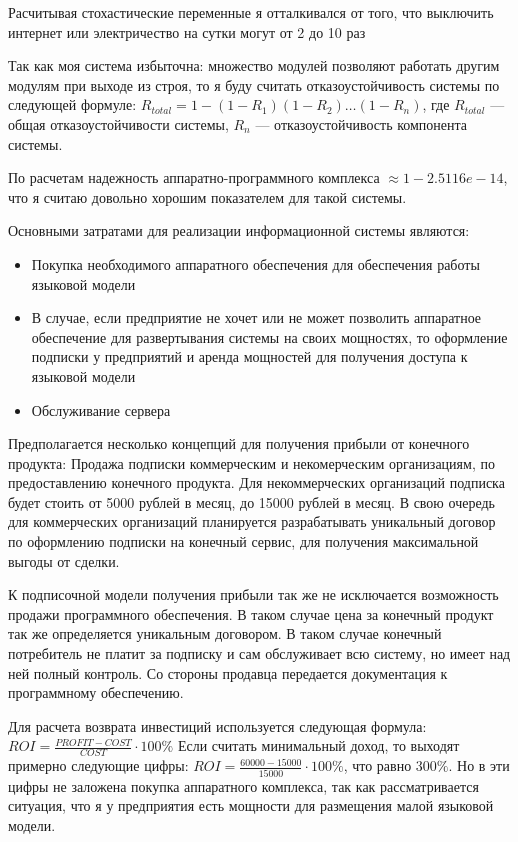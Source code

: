 Расчитывая стохастические переменные я отталкивался от того, что выключить
интернет или электричество на сутки могут от 2 до 10 раз

Так как моя система избыточна: множество модулей позволяют работать другим
модулям при выходе из строя, то я буду считать отказоустойчивость системы по
следующей формуле: $R_{total} = 1 - (1 - R_1)(1 - R_2)\ldots(1 - R_n)$, где 
$R_{total}$ --- общая отказоустойчивости системы, $R_n$ --- отказоустойчивость
компонента системы. 

По расчетам надежность аппаратно-программного комплекса
$\approx 1 - 2.5116e-14$, что я считаю довольно хорошим показателем для
такой системы.


Основными затратами для реализации информационной системы являются:

\begin{itemize}
\item Покупка необходимого аппаратного обеспечения для обеспечения работы
    языковой модели
\item В случае, если предприятие не хочет или не может позволить аппаратное 
    обеспечение для развертывания системы на своих мощностях, то оформление 
    подписки у предприятий и аренда мощностей для получения доступа к языковой 
    модели
\item Обслуживание сервера
\end{itemize}

Предполагается несколько концепций для получения прибыли от конечного продукта:
Продажа подписки коммерческим и некомерческим организациям, по предоставлению 
конечного продукта. Для некоммерческих организаций подписка будет стоить от 
5000 рублей в месяц, до 15000 рублей в месяц. В свою очередь для коммерческих
организаций планируется разрабатывать уникальный договор по оформлению подписки
на конечный сервис, для получения максимальной выгоды от сделки.

К подписочной модели получения прибыли так же не исключается возможность продажи
программного обеспечения. В таком случае цена за конечный продукт так же 
определяется уникальным договором. В таком случае конечный потребитель не 
платит за подписку и сам обслуживает всю систему, но имеет над ней полный 
контроль. Со стороны продавца передается документация к программному обеспечению.

Для расчета возврата инвестиций используется следующая формула: 
$ROI = \frac{PROFIT - COST}{COST} \cdot 100\%$
Если считать минимальный доход, то выходят примерно следующие цифры:
$ROI = \frac{60000 - 15000}{15000} \cdot 100\%$,
что равно $300\%$. Но в эти цифры не заложена покупка аппаратного комплекса, 
так как рассматривается ситуация, что я у предприятия есть мощности для 
размещения малой языковой модели.

